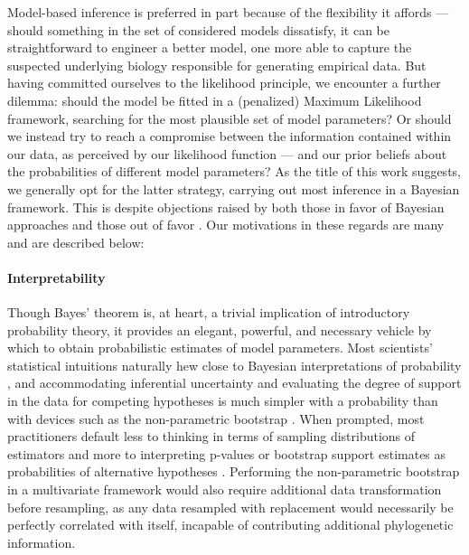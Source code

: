 Model-based inference is preferred in part because of the flexibility it affords --- should something in the set of considered models dissatisfy, it can be straightforward to engineer a better model, one more able to capture the suspected underlying biology responsible for generating empirical data. But having committed ourselves to the likelihood principle, we encounter a further dilemma: should the model be fitted in a (penalized) Maximum Likelihood framework, searching for the most plausible set of model parameters? Or should we instead try to reach a compromise between the information contained within our data, as perceived by our likelihood function --- and our prior beliefs about the probabilities of different model parameters? As the title of this work suggests, we generally opt for the latter strategy, carrying out most inference in a Bayesian framework. This is despite objections raised by both those in favor of Bayesian approaches \citep{gelmanHolesBayesianStatistics2020} and those out of favor \citep{gelmanObjectionsBayesianStatistics2008}. Our motivations in these regards are many and are described below:

\paragraph{Interpretability}

Though Bayes' theorem is, at heart, a trivial implication of introductory probability theory, it provides an elegant, powerful, and necessary vehicle by which to obtain probabilistic estimates of model parameters. Most scientists' statistical intuitions naturally hew close to Bayesian interpretations of probability \citep{kaplanNullRitualWhat2004}, and accommodating inferential uncertainty and evaluating the degree of support in the data for competing hypotheses is much simpler with a probability than with devices such as the non-parametric bootstrap \citep{efronBootstrapMethodsAnother1979, felsensteinConfidenceLimitsPhylogenies1985}. When prompted, most practitioners default less to thinking in terms of sampling distributions of estimators and more to interpreting p-values or bootstrap support estimates as probabilities of alternative hypotheses \citep{greenlandStatisticalTestsValues2016}. Performing the non-parametric bootstrap in a multivariate framework would also require additional data transformation before resampling, as any data resampled with replacement would necessarily be perfectly correlated with itself, incapable of contributing additional phylogenetic information.

